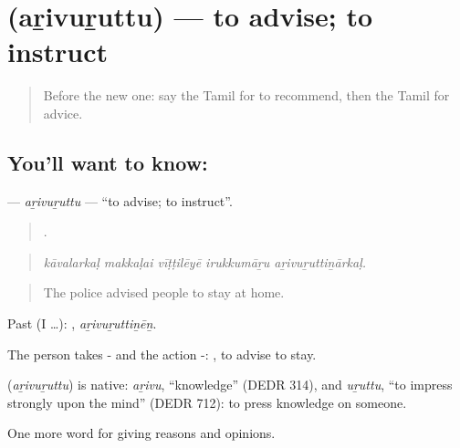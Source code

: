 \section[\texorpdfstring{\ta{அறிவுறுத்து} (aṟivuṟuttu)}{அறிவுறுத்து (aṟivuṟuttu)}]{ (aṟivuṟuttu) — to advise; to instruct}

\label{lesson:TA-C355-arivuruttu}



\begin{quote}
Before the new one: say the Tamil for to recommend, then the Tamil for advice.
\end{quote}

\subsection*{You'll want to know: }
\textbf{} — \emph{aṟivuṟuttu} — \textquotedblleft{}to advise; to instruct\textquotedblright{}.

\begin{quote}
    .
\end{quote}

\begin{quote}
\emph{kāvalarkaḷ makkaḷai vīṭṭilēyē irukkumāṟu aṟivuṟuttiṉārkaḷ.}
\end{quote}

\begin{quote}
The police advised people to stay at home.
\end{quote}

Past (I …): , \emph{aṟivuṟuttiṉēṉ}.

The person takes - and the action -:  , to advise to stay.

\begin{cousinweb}
\textbf{} (\emph{aṟivuṟuttu}) is native: \emph{aṟivu}, \textquotedblleft{}knowledge\textquotedblright{} (DEDR 314), and \emph{uṟuttu}, \textquotedblleft{}to impress strongly upon the mind\textquotedblright{} (DEDR 712): to press knowledge on someone.
\end{cousinweb}

\begin{grammarlens}[title={What you've built}]
One more word for giving reasons and opinions.
\end{grammarlens}

